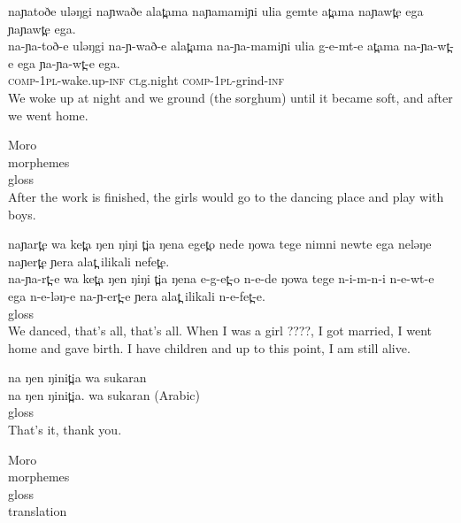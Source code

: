 \ex  naɲatoðe uləŋgi naɲwaðe alat̪ama naɲamamiɲi ulia gemte at̪ama naɲawt̪e ega ɲaɲawt̪e ega. 	  \\ 
	\gll  na-ɲa-toð-e uləŋgi na-ɲ-wað-e alat̪ama na-ɲa-mamiɲi ulia g-e-mt-e at̪ama na-ɲa-wt̪-e ega ɲa-ɲa-wt̪-e ega. \\	
		  \textsc{comp-1pl}-wake.up-\textsc{inf} \textsc{cl}g.night \textsc{comp-1pl}-grind-\textsc{inf}  \\
		 \glt We woke up at night and we ground (the sorghum) until it became soft, and after we went home. 
		 		 	  	  
\ex  Moro	  \\ 
	\gll  morphemes\\	
		  gloss  \\
		 \glt After the work is finished, the girls would go to the dancing place and play with boys.  
		 		 	  	  
\ex  naɲart̪e wa ket̪a ŋen ŋiŋi t̪ia ŋena eget̪o nede ŋowa tege nimni newte ega neləŋe naɲert̪e ɲera alat̪ ilikali nefet̪e. 	  \\ 
	\gll  na-ɲa-rt̪-e wa ket̪a ŋen ŋiŋi t̪ia ŋena e-g-et̪-o n-e-de ŋowa tege n-i-m-n-i n-e-wt-e ega n-e-ləŋ-e na-ɲ-ert̪-e ɲera alat̪ ilikali n-e-fet̪-e. \\	
		  gloss  \\
		 \glt We danced, that's all, that's all. When I was a girl ????, I got married, I went home and gave birth. I have children and up to this point, I am still alive.  
		 		 	  	  
\ex  na ŋen ŋinit̪ia wa sukaran	  \\ 
	\gll  na ŋen ŋinit̪ia. wa sukaran (Arabic)\\	
		  gloss  \\
		 \glt That's it, thank you. \z 
		 		 	  	  
\ex  Moro	  \\ 
	\gll  morphemes\\	
		  gloss  \\
		 \glt translation 
		
\z





